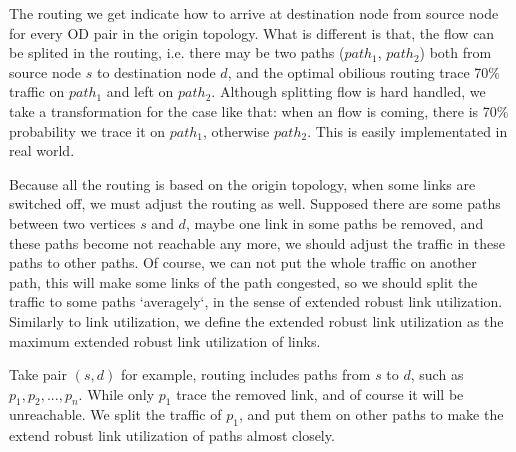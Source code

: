 \documentclass[conference]{IEEEtran}
\begin{document}
The routing we get indicate how to arrive at destination node from source node for every OD pair in the origin topology.
What is different is that, the flow can be splited in the routing, i.e. there may be two paths ($path_1$, $path_2$)
both from source node $s$ to destination node $d$, and the optimal obilious routing trace 70\% traffic on 
$path_1$ and left on $path_2$. Although splitting flow is hard handled, we take a transformation for the case like that:
when an flow is coming, there is 70\% probability we trace it on $path_1$, otherwise $path_2$. This is easily implementated 
in real world.


Because all the routing is based on the origin topology, when some links are switched off, we must adjust the routing 
as well. Supposed there are some paths between two vertices $s$ and $d$, maybe one link in some paths be removed, 
and these paths become not reachable any more, we should adjust the traffic in these paths to other paths. Of course,
we can not put the whole traffic on another path, this will make some links of the path congested, so we should split the traffic 
to some paths `averagely`, in the sense of extended robust link utilization. Similarly to link utilization, we define the extended
robust link utilization as the maximum extended robust link utilization of links.


Take pair $(s, d)$ for example, routing includes paths from $s$ to $d$, such as $p_1, p_2, ... , p_n$. While only $p_1$ trace 
the removed link, and of course it will be unreachable. We split the traffic of $p_1$, and put them on other paths to make 
the extend robust link utilization of paths almost closely.
\end{document}
